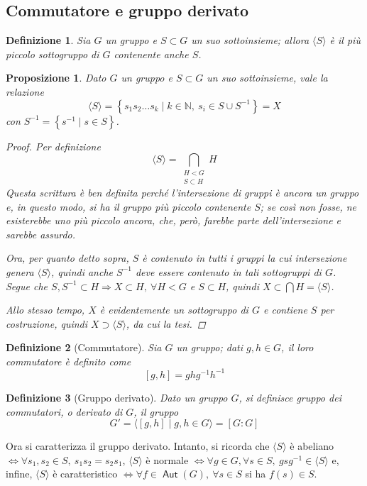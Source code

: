 \documentclass[11pt]{scrartcl}
\theoremstyle{style1}
\newtheorem{prop}{Proposizione}[section]
\newtheorem{definizione}{Definizione}[section]
\numberwithin{equation}{subsection}
\renewcommand{\operatorname}[1]{\mathop{\mathrm{\textsf{#1}}}}
\begin{document}
\subsection{Commutatore e gruppo derivato}


\begin{definizione}
	Sia $G$ un gruppo e $S \subset G$ un suo sottoinsieme; allora $\langle S \rangle$ \`e il pi\`u piccolo sottogruppo di $G$ contenente anche $S$.
\end{definizione}
\begin{prop}
	Dato $G$ un gruppo e $S \subset G$ un suo sottoinsieme, vale la relazione
	\[
	\langle S \rangle= \left\{ s_1s_2 \ldots s_k  \mid k \in \mathbb{N}, \ s_i \in S \cup S^{-1} \right\} = X
	\] 
	con $S^{-1}= \left\{ s^{-1}  \mid  s \in S \right\} $.
	\begin{proof}
		Per definizione
		\[
			\langle S \rangle= \bigcap_{\substack{H < G \\ S \subset H}} H
		\] 
		Questa scrittura \`e ben definita perch\'e l'intersezione di gruppi \`e ancora un gruppo e, in questo modo, si ha il gruppo pi\`u piccolo contenente $S$; se cos\`i non fosse, ne esisterebbe uno pi\`u piccolo ancora, che, per\`o, farebbe parte dell'intersezione e sarebbe assurdo.

		Ora, per quanto detto sopra, $S$ \`e contenuto in tutti i gruppi la cui intersezione genera $\langle S \rangle$, quindi anche $S^{-1} $ deve essere contenuto in tali sottogruppi di $G$.
		Segue che $S,S^{-1}\subset H \Rightarrow X \subset H, \ \forall H < G$ e $S \subset H$, quindi $X \subset \bigcap H = \langle S \rangle$.

		Allo stesso tempo, $X$ \`e evidentemente un sottogruppo di $G$ e contiene $S$ per costruzione, quindi $X \supset \langle S \rangle$, da cui la tesi.
	\end{proof}
\end{prop}
\begin{definizione}
	[Commutatore]
	Sia $G$ un gruppo; dati $g,h \in G$, il loro \textit{commutatore} \`e definito come
	\[
		[g,h] = ghg^{-1} h^{-1}
	\] 
\end{definizione}
\begin{definizione}
	[Gruppo derivato]
	Dato un gruppo $G$, si definisce \textit{gruppo dei commutatori}, o \textit{derivato} di $G$, il gruppo 
	\[
		G ' = \langle [g,h]  \mid g,h \in G \rangle = [G:G]
	\] 
\end{definizione}
\noindent Ora si caratterizza il gruppo derivato.
Intanto, si ricorda che $\langle S \rangle$ \`e abeliano $\iff \forall s_1,s_2\in S , \  s_1s_2=s_2s_1$, $\langle S \rangle$ \`e normale $\iff \forall g \in G, \forall s \in S, \ gsg^{-1} \in \langle S \rangle$ e, infine, $\langle S \rangle$ \`e caratteristico $\iff \forall f \in \operatorname{Aut} (G) ,\ \forall s \in S$ si ha $f(s) \in S$.
\end{document}
